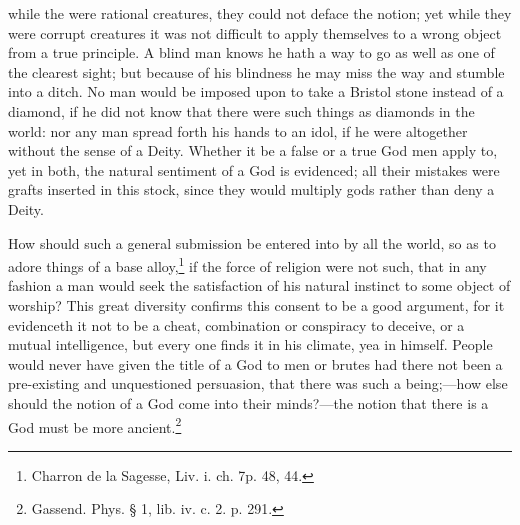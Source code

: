 \documentclass[a5paper]{book}
\begin{document}
    while the were rational creatures, 
    they could not deface the notion; 
    yet while they were corrupt creatures it was not difficult 
    to apply themselves to a wrong object from a true principle. 
A blind man knows he hath a way to go as well as one of the clearest sight; 
    but because of his blindness he may miss the way and stumble into a ditch. 
No man would be imposed upon to take a Bristol stone instead of a diamond, 
    if he did not know that there were such things as diamonds in the world: 
    nor any man spread forth his hands to an idol, 
    if he were altogether without the sense of a Deity. 
Whether it be a false or a true God men apply to, yet in both, 
    the natural sentiment of a God is evidenced;
    all their mistakes were grafts inserted in this stock, 
    since they would multiply gods rather than deny a Deity.

How should such a general submission be entered into by all the world, 
    so as to adore things of a base alloy,\footnote{Charron de la Sagesse, Liv. i. ch. 7p. 48, 44.}
    if the force of religion were not such, 
    that in any fashion a man would seek the satisfaction 
    of his natural instinct to some object of worship? 
This great diversity confirms this consent to be a good argument, 
    for it evidenceth it not to be a cheat, combination 
    or conspiracy to deceive, or a mutual intelligence, 
    but every one finds it in his climate, 
    yea in himself.
People would never have given the title of a God to men or brutes
    had there not been a pre-existing and unquestioned persuasion, 
    that there was such a being;---how else should 
    the notion of a God come into their minds?---the notion 
    that there is a God must be more ancient.\footnote{Gassend. Phys. § 1, lib. iv. c. 2. p. 291.}
\end{document}
